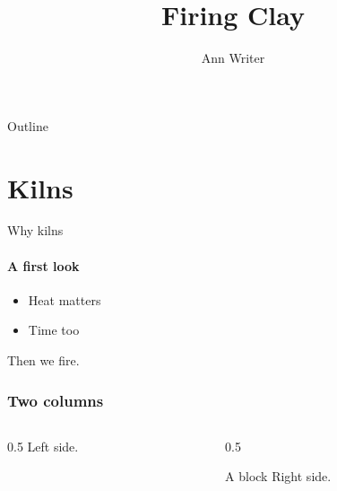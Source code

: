 \documentclass{beamer}
\title{Firing Clay}
\author{Ann Writer}
\institute{Pottery Lab}
\begin{document}
\begin{frame}
  \titlepage
\end{frame}

\begin{frame}{Outline}
  \tableofcontents
\end{frame}

\section{Kilns}

\begin{frame}[fragile]{Why kilns}
  \framesubtitle{A first look}
  \begin{itemize}
    \item<1-> Heat \alert{matters}
    \item<2-> Time too
  \end{itemize}
  \pause
  Then we fire.
\end{frame}

\begin{frame}
  \frametitle{Two columns}
  \begin{columns}
    \begin{column}{0.5\textwidth}
      Left side.
    \end{column}
    \begin{column}{0.5\textwidth}
      \begin{block}{A block}
        Right side.
      \end{block}
    \end{column}
  \end{columns}
\end{frame}
\end{document}
